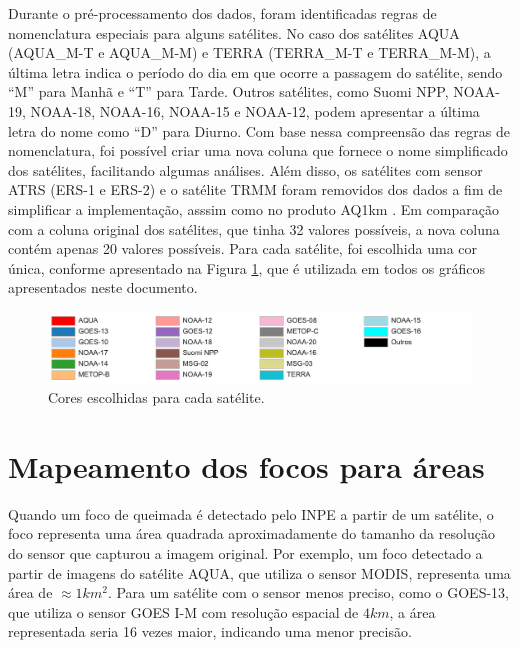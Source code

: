 \documentclass[cic,tc]{iiufrgs}
\begin{document}
Durante o pré-processamento dos dados, foram identificadas regras de nomenclatura especiais para alguns satélites. No caso dos satélites AQUA (AQUA\_M-T e AQUA\_M-M) e TERRA (TERRA\_M-T e TERRA\_M-M), a última letra indica o período do dia em que ocorre a passagem do satélite, sendo ``M'' para Manhã e ``T'' para Tarde. Outros satélites, como Suomi NPP, NOAA-19, NOAA-18, NOAA-16, NOAA-15 e NOAA-12, podem apresentar a última letra do nome como ``D'' para Diurno. Com base nessa compreensão das regras de nomenclatura, foi possível criar uma nova coluna que fornece o nome simplificado dos satélites, facilitando algumas análises. Além disso, os satélites com sensor ATRS (ERS-1 e ERS-2) e o satélite TRMM foram removidos dos dados a fim de simplificar a implementação, asssim como no produto AQ1km \citep{libonati2015algorithm}. Em comparação com a coluna original dos satélites, que tinha 32 valores possíveis, a nova coluna contém apenas 20 valores possíveis. Para cada satélite, foi escolhida uma cor única, conforme apresentado na Figura \ref{fig:cores_satelites}, que é utilizada em todos os gráficos apresentados neste documento. 

\begin{figure}[!htb]
    \caption{Cores escolhidas para cada satélite.}
    \begin{center}
        \includegraphics[width=35em]{cores_satelites}
    \end{center}
    \label{fig:cores_satelites}
\end{figure}


\section{Mapeamento dos focos para áreas}
\label{sec:focos_para_areas}

Quando um foco de queimada é detectado pelo INPE a partir de um satélite, o foco representa uma área quadrada aproximadamente do tamanho da resolução do sensor que capturou a imagem original. Por exemplo, um foco detectado a partir de imagens do satélite AQUA, que utiliza o sensor MODIS, representa uma área de $\approx1 km^2$. Para um satélite com o sensor menos preciso, como o GOES-13, que utiliza o sensor GOES I-M com resolução espacial de $4 km$, a área representada seria 16 vezes maior, indicando uma menor precisão.
\end{document}
